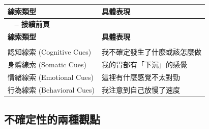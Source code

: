 \documentclass[12pt,a4paper]{article}
\begin{document}
\begin{longtable}{>{\raggedright\arraybackslash}p{6cm} >{\raggedright\arraybackslash}p{9cm}}
\toprule
\textbf{\textcolor{emergency_blue}{線索類型}} & \textbf{\textcolor{emergency_blue}{具體表現}} \\
\midrule
\endfirsthead

\multicolumn{2}{c}%
{{\bfseries \tablename\ \thetable{} -- 接續前頁}} \\
\toprule
\textbf{\textcolor{emergency_blue}{線索類型}} & \textbf{\textcolor{emergency_blue}{具體表現}} \\
\midrule
\endhead

\midrule \multicolumn{2}{r}{{接續下頁}} \\ \midrule
\endfoot

\bottomrule
\endlastfoot

\textcolor{emergency_red}{認知線索 (Cognitive Cues)} & 我不確定發生了什麼或該怎麼做 \\

\textcolor{emergency_red}{身體線索 (Somatic Cues)} & 我的胃部有「下沉」的感覺 \\

\textcolor{emergency_red}{情緒線索 (Emotional Cues)} & 這裡有什麼感覺不太對勁 \\

\textcolor{emergency_red}{行為線索 (Behavioral Cues)} & 我注意到自己放慢了速度 \\
\end{longtable}

\subsection{不確定性的兩種觀點}
\end{document}

